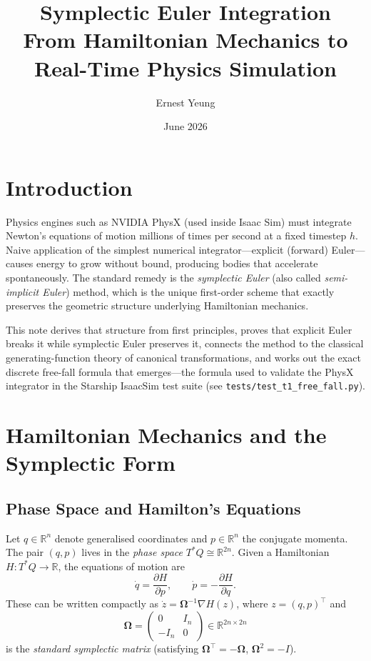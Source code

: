 \documentclass[11pt]{article}
\title{%
  \textbf{Symplectic Euler Integration}\\[4pt]
  \large From Hamiltonian Mechanics to Real-Time Physics Simulation
}
\author{Ernest Yeung}
\date{June 2026}
\newcommand{\R}{\mathbb{R}}
\newcommand{\pderiv}[2]{\frac{\partial #1}{\partial #2}}
\newcommand{\Omg}{\boldsymbol{\Omega}} %
\begin{document}
\maketitle
\tableofcontents
\bigskip

\section{Introduction}

Physics engines such as NVIDIA PhysX (used inside Isaac Sim) must integrate
Newton's equations of motion millions of times per second at a fixed timestep
$h$.  Naive application of the simplest numerical integrator---explicit
(forward) Euler---causes energy to grow without bound, producing bodies that
accelerate spontaneously.  The standard remedy is the \emph{symplectic Euler}
(also called \emph{semi-implicit Euler}) method, which is the unique first-order
scheme that exactly preserves the geometric structure underlying Hamiltonian
mechanics.

This note derives that structure from first principles, proves that explicit
Euler breaks it while symplectic Euler preserves it, connects the method to
the classical generating-function theory of canonical transformations, and works
out the exact discrete free-fall formula that emerges---the formula used to
validate the PhysX integrator in the Starship IsaacSim test suite (see
\texttt{tests/test\_t1\_free\_fall.py}).

\section{Hamiltonian Mechanics and the Symplectic Form}

\subsection{Phase Space and Hamilton's Equations}

Let $q \in \R^n$ denote generalised coordinates and $p \in \R^n$ the
conjugate momenta.  The pair $(q, p)$ lives in the \emph{phase space}
$T^*Q \cong \R^{2n}$.  Given a Hamiltonian $H : T^*Q \to \R$, the equations
of motion are
\begin{equation}\label{eq:hamilton}
  \dot{q} = \pderiv{H}{p}, \qquad
  \dot{p} = -\pderiv{H}{q}.
\end{equation}
These can be written compactly as $\dot{z} = \Omg^{-1} \nabla H(z)$, where
$z = (q, p)^{\top}$ and
\begin{equation}\label{eq:symplectic_matrix}
  \Omg =
  \begin{pmatrix} 0 & I_n \\ -I_n & 0 \end{pmatrix}
  \in \R^{2n \times 2n}
\end{equation}
is the \emph{standard symplectic matrix} (satisfying
$\Omg^{\top} = -\Omg$, $\Omg^2 = -I$).
\end{document}

